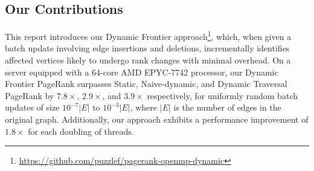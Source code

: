 \subsection{Our Contributions}

This report introduces our Dynamic Frontier approach\footnote{\url{https://github.com/puzzlef/pagerank-openmp-dynamic}}, which, when given a batch update involving edge insertions and deletions, incrementally identifies affected vertices likely to undergo rank changes with minimal overhead. On a server equipped with a 64-core AMD EPYC-7742 processor, our Dynamic Frontier PageRank surpasses Static, Naive-dynamic, and Dynamic Traversal PageRank by $7.8\times$, $2.9\times$, and $3.9\times$ respectively, for uniformly random batch updates of size $10^{-7}|E|$ to $10^{-3}|E|$, where $|E|$ is the number of edges in the original graph. Additionally, our approach exhibits a performance improvement of $1.8\times$ for each doubling of threads.








